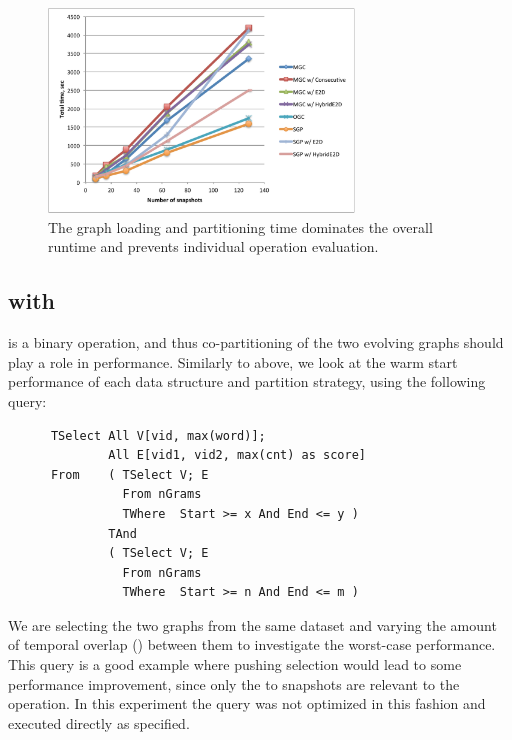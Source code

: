 \begin{figure}[t!]
\includegraphics[width=3.2in]{figs/tgroupe_cold.pdf}
\caption{The graph loading and partitioning time dominates the overall
  runtime and prevents individual operation evaluation.}
\label{fig:tgroupe_cold}
\end{figure}


\subsection{ with }

 is a binary operation, and thus co-partitioning of the
two evolving graphs should play a role in performance.  Similarly to
 above, we look at the warm start performance of each
data structure and partition strategy, using the following query:

\begin{small}
\begin{verbatim}
      TSelect All V[vid, max(word)];
              All E[vid1, vid2, max(cnt) as score]
      From    ( TSelect V; E
                From nGrams
                TWhere  Start >= x And End <= y )
              TAnd
              ( TSelect V; E
                From nGrams
                TWhere  Start >= n And End <= m )      
\end{verbatim}
\end{small}

We are selecting the two graphs from the same dataset and varying the
amount of temporal overlap () between them to investigate
the worst-case performance.  This query is a good example where
pushing selection would lead to some performance improvement, since
only the  to  snapshots are relevant to the
operation.  In this experiment the query was not optimized in this
fashion and executed directly as specified.

